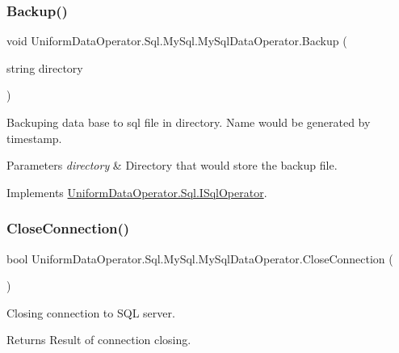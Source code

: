 \subsubsection{\texorpdfstring{Backup()}{Backup()}}
{\footnotesize\ttfamily void Uniform\+Data\+Operator.\+Sql.\+My\+Sql.\+My\+Sql\+Data\+Operator.\+Backup (\begin{DoxyParamCaption}\item[{string}]{directory }\end{DoxyParamCaption})}



Backuping data base to sql file in directory. Name would be generated by timestamp. 


\begin{DoxyParams}{Parameters}
{\em directory} & Directory that would store the backup file.\\
\hline
\end{DoxyParams}


Implements \mbox{\hyperlink{interface_uniform_data_operator_1_1_sql_1_1_i_sql_operator_a096be4f746c1fcbb8b2894c2517b937c}{Uniform\+Data\+Operator.\+Sql.\+I\+Sql\+Operator}}.

\mbox{\label{class_uniform_data_operator_1_1_sql_1_1_my_sql_1_1_my_sql_data_operator_ae096306ef55611afbe96b0017f2032f6}} 
\subsubsection{\texorpdfstring{Close\+Connection()}{CloseConnection()}}
{\footnotesize\ttfamily bool Uniform\+Data\+Operator.\+Sql.\+My\+Sql.\+My\+Sql\+Data\+Operator.\+Close\+Connection (\begin{DoxyParamCaption}{ }\end{DoxyParamCaption})}



Closing connection to S\+QL server. 

\begin{DoxyReturn}{Returns}
Result of connection closing.
\end{DoxyReturn}


